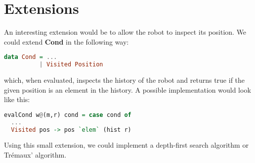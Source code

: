 \documentclass[a4paper]{article}
\newcommand{\func}[1]{\textbf{\ttfamily #1}\xspace}
\begin{document}
\section{Extensions}
An interesting extension would be to allow the robot to inspect its
position. We could extend \func{Cond} in the following way:
\begin{lstlisting}[language=haskell]
data Cond = ...
          | Visited Position
\end{lstlisting}
which, when evaluated, inspects the history of the robot and returns
true if the given position is an element in the history. A possible implementation would look like this:
\begin{lstlisting}[language=haskell]
evalCond w@(m,r) cond = case cond of
  ...
  Visited pos -> pos `elem` (hist r)
\end{lstlisting}
Using this small extension, we could implement a depth-first search algorithm or
Trémaux' algorithm.
\end{document}
